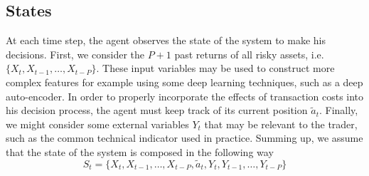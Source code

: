 \subsection{States}
At each time step, the agent observes the state of the system to  make his decisions. First, we consider the $P+1$ past returns of all risky assets, i.e. $\{X_t, X_{t-1}, \ldots, X_{t-P}\}$. These input variables may be used to construct more complex features for example using some deep learning techniques, such as a deep auto-encoder. In order to properly incorporate the effects of transaction costs into his decision process, the agent must keep track of its current position $\tilde{a}_t$. Finally, we might consider some external variables $Y_t$ that may be relevant to the trader, such as the common technical indicator used in practice. Summing up, we assume that the state of the system is composed in the following way 
\begin{equation}
	S_t = \{X_t, X_{t-1}, \ldots, X_{t-P}, \tilde{a}_t, Y_t, Y_{t-1}, \ldots,
	Y_{t-P}\}
\end{equation}

